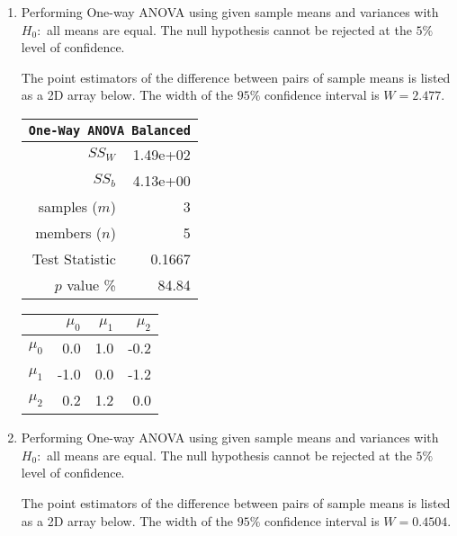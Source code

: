 \begin{enumerate}
	\item Performing One-way ANOVA using given sample means and variances with $ H_0 : $ all means are equal. The null hypothesis cannot be rejected at the $ 5\% $ level of confidence.
	
	The point estimators of the difference between pairs of sample means is listed as a 2D array below. The width of the $ 95\% $ confidence interval is $ W = 2.477 $.
	
	\begin{table}[H]
		\centering
		\begin{minipage}{0.4\textwidth}
			\centering
			\begin{tabular}{@{}rr@{}}
				\toprule
				\multicolumn{2}{c}{\texttt{One-Way ANOVA Balanced}} \\
				\midrule
				$SS_W$         &               1.49e+02 \\
				$SS_b$         &               4.13e+00 \\
				samples ($m$)  &                      3 \\
				members ($n$)  &                      5 \\
				Test Statistic &                 0.1667 \\
				$p$ value \%   &                  84.84 \\
				\bottomrule
			\end{tabular}
		\end{minipage}
		\begin{minipage}{0.4\textwidth}
			\centering
			\begin{tabular}{lrrr}
				\toprule
				{} &  $\mu_0$ &  $\mu_1$ &  $\mu_2$ \\
				\midrule
				$\mu_0$ &      0.0 &      1.0 &     -0.2 \\
				$\mu_1$ &     -1.0 &      0.0 &     -1.2 \\
				$\mu_2$ &      0.2 &      1.2 &      0.0 \\
				\bottomrule
			\end{tabular}
		\end{minipage}
	\end{table}

	\item Performing One-way ANOVA using given sample means and variances with $ H_0 : $ all means are equal. The null hypothesis cannot be rejected at the $ 5\% $ level of confidence.
	
	The point estimators of the difference between pairs of sample means is listed as a 2D array below. The width of the $ 95\% $ confidence interval is $ W = 0.4504 $.
	

\end{enumerate}
